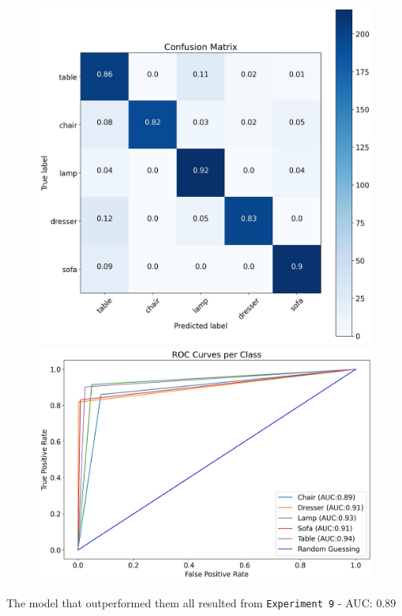 \documentclass[11pt,a4paper]{article}
\begin{document}
\begin{figure}[H]
{{    \includegraphics[scale=0.13]{imgs/experiments/pointclouds/pointnet-8/PointNet-8-TESTING-confusion-matrix.jpg}
    \includegraphics[scale=0.13]{imgs/experiments/pointclouds/pointnet-8/PointNet-8-TESTING-ROC.jpg}
    }}
\end{figure}
\noindent
The model that outperformed them all resulted from \texttt{Experiment 9} - AUC: $0.89$
\end{document}
